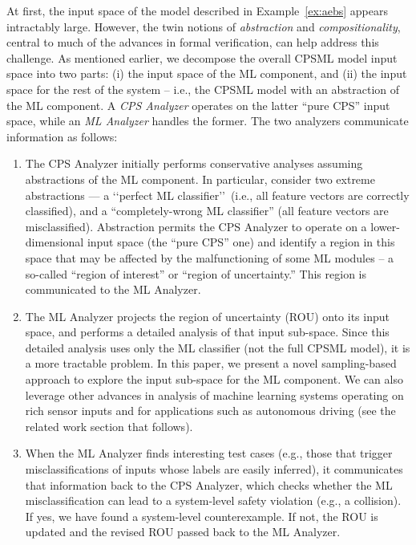 At first, the input space of the model described in Example~\ref{ex:aebs} appears intractably large.
However, the twin notions of {\em abstraction} and {\em compositionality},
central to much of the advances in formal verification, can help address
this challenge. As mentioned earlier, we decompose the overall CPSML
model input space into two parts: (i) the input space of the ML component,
and (ii) the input space for the rest of the system -- i.e., the CPSML
model with an abstraction of the ML component.
A {\em CPS Analyzer} operates on the latter ``pure CPS'' input space,
while an {\em ML Analyzer} handles the former. 
The two analyzers communicate information as follows:
\begin{enumerate}
	\item The CPS Analyzer initially performs conservative analyses assuming abstractions of the ML component. In particular, consider two extreme abstractions --- a \lq\lq perfect ML classifier\rq\rq\ (i.e., all feature vectors are correctly classified), and a ``completely-wrong ML classifier'' (all feature vectors are misclassified). Abstraction permits the CPS Analyzer to operate on a lower-dimensional input space (the ``pure CPS'' one) and identify a region in this space that may be
affected by the malfunctioning of some ML modules -- a so-called ``region of interest'' or ``region of uncertainty.''
This region is communicated to the ML Analyzer.

	\item The ML Analyzer projects the region of uncertainty (ROU) onto its input space, and performs a detailed analysis of that input sub-space. Since this detailed analysis uses only the ML classifier (not the full CPSML model), it is a more tractable problem. In this paper, we present a novel
sampling-based approach to explore the input sub-space for the ML
component. We can also leverage other advances in analysis of machine 
learning systems operating on rich sensor inputs and for applications
such as autonomous driving (see the related work section that follows).

	\item When the ML Analyzer finds interesting test cases (e.g., those that trigger misclassifications of inputs whose labels are easily inferred), it communicates that information back to the CPS Analyzer, which checks whether the ML misclassification can lead to a system-level safety violation (e.g., a collision). If yes, we have found a system-level counterexample.
If not, the ROU is updated and the revised ROU passed back to the ML Analyzer. 

\end{enumerate}
